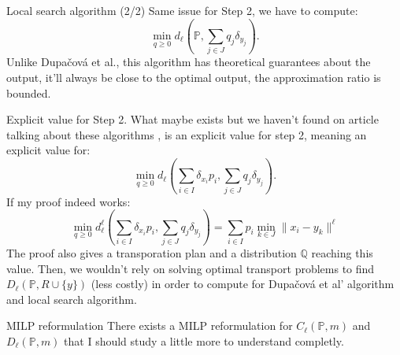 \documentclass{beamer}
\theoremstyle{plain}
\begin{document}
\begin{frame}{Local search algorithm (2/2)}
    Same issue for Step 2, we have to compute:
    $$
    \min_{q\geq 0}d_\ell\left(\mathbb{P}, \sum_{j\in J}q_j\delta_{y_j}\right).
    $$
    Unlike Dupačová et al., this algorithm has theoretical guarantees about the output, it'll always be close to the optimal output, \alert{the approximation ratio is bounded.}
\end{frame}

\begin{frame}{Explicit value for Step 2.}
    What maybe exists but we haven't found on article talking about these algorithms \cite{rujeerapaiboon_scenario_2022}, \cite{bertsimas_optimization-based_2023} is an \alert{explicit value} for step 2, meaning an explicit value for: 
    $$
     \min_{q\geq 0}d_\ell\left(\sum_{i\in I}\delta_{x_i}p_i, \sum_{j\in J}q_j\delta_{y_j}\right).
    $$
    If my proof indeed works: 
    $$
    \min_{q\geq 0}d_\ell^\ell\left(\sum_{i\in I}\delta_{x_i}p_i, \sum_{j\in J}q_j\delta_{y_j}\right)=\sum_{i\in I}p_i\min_{k\in J}\lVert x_i-y_k\rVert^\ell
$$
The proof also gives \alert{a transporation plan} and a \alert{distribution $\mathbb{Q}$} reaching this value. Then, \alert{we wouldn't rely on solving optimal transport problems to find $D_\ell\left(\mathbb{P},R\cup\{y\}\right)$} (less costly) in order to compute for Dupačová et al' algorithm and local search algorithm.
\end{frame}

\begin{frame}{MILP reformulation}
    There exists a MILP reformulation for \alert{$C_\ell\left(\mathbb{P},m\right)$} and \alert{$D_\ell\left(\mathbb{P},m\right)$} that I should study a little more to understand completly.
\end{frame}
\end{document}
